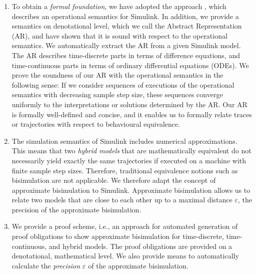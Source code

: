 \documentclass[conference]{IEEEtran}
\begin{document}
\begin{enumerate}[itemsep=0pt]
\item To obtain a \emph{formal foundation}, we have adopted the approach \cite{Bouissou.2012}, which describes an operational semantics for Simulink. In addition, we provide a semantics on denotational level, which we call the Abstract Representation (AR), and have shown that it is sound with respect to the operational semantics.
We automatically extract the AR from a given Simulink model. The AR describes time-discrete parts in terms of difference equations, and time-continuous parts in terms of ordinary differential equations (ODEs). 
We prove the soundness of our AR with the operational semantics in the following sense: If we consider sequences of executions of the operational semantics with decreasing sample step size, these sequences converge uniformly to the interpretations or solutions determined by the AR.
Our AR is formally well-defined and concise, and it enables us to formally relate traces or trajectories with respect to behavioural equivalence.

\item The simulation semantics of Simulink includes numerical approximations. This means that  
two \emph{hybrid models} that are mathematically equivalent do not necessarily yield exactly the same trajectories if executed on a machine with finite sample step sizes. Therefore, traditional equivalence notions such as bisimulation are not applicable. We therefore adapt the concept of approximate bisimulation to Simulink. Approximate bisimulation allows us to relate two models that are close to each other up to a maximal distance $\varepsilon$, the precision of the approximate bisimulation.

\item We provide a proof scheme, i.e., an approach for automated generation of proof obligations to show approximate bisimulation for time-discrete, time-continuous, and hybrid models. The proof obligations are provided on a denotational, mathematical level. We also provide means to automatically calculate the \emph{precision $\varepsilon$} of the approximate bisimulation.



\end{enumerate}
\end{document}
